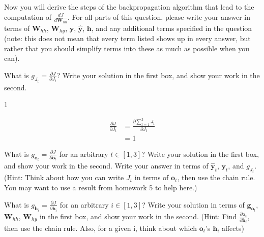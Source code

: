 \documentclass[11pt,addpoints,answers]{exam}
\newcommand{\gv}{\mathbf{g}}
\newcommand{\hv}{\mathbf{h}}
\newcommand{\ov}{\mathbf{o}}
\newcommand{\yv}{\mathbf{y}}
\newcommand{\Wv}{\mathbf{W}}
\begin{document}
\begin{questions}
\begin{parts}
\begin{subparts}
\subpart Now you will derive the steps of the backpropagation algorithm that lead to the computation of $\frac{dJ}{d\Wv_{hh}}$. For all parts of this question, please write your answer in terms of $\Wv_{hh}$, $\Wv_{hy}$, $\yv$, $\hat{\yv}$, $\hv$, and any additional terms specified in the question (note: this does not mean that every term listed shows up in every answer, but rather that you should simplify terms into these as much as possible when you can).
\clearpage
    \begin{subsubparts}
        \subsubpart[2] What is $g_{J_t} = \frac{\partial J}{\partial J_t}$? Write your solution in the first box, and show your work in the second.
        
    \begin{your_solution}[title=$\frac{\partial J}{\partial J_t}$,height=2.5cm,width=8.5cm]
    1
    \end{your_solution}
    
    \begin{your_solution}[title=Work,height=6cm,width=14cm]
	\[
	\begin{aligned}
		\frac{\partial J}{\partial J_t} &= \frac{\partial \sum_{t=1}^3 J_t}{\partial J_t} \\
										&= 1
	\end{aligned}
	\]    
    \end{your_solution}

     \subsubpart[2] What is $g_{\ov_t} = \frac{\partial J}{\partial \ov_t}$ for an arbitrary $t \in [1,3]$? Write your solution in the first box, and show your work in the second. Write your answer in terms of $\hat{\yv}_t$, $\yv_t$, and $g_{J_t}$. (Hint: Think about how you can write $J_t$ in terms of $\ov_t$, then use the chain rule. You may want to use a result from homework 5 to help here.)
        
    \begin{your_solution}[title=$\frac{\partial J}{\partial \ov_t}$,height=2.5cm,width=8.5cm]
    \end{your_solution}
    
    \begin{your_solution}[title=Work,height=6cm,width=14cm]
    \end{your_solution}

\clearpage
    \subsubpart[2] What is $g_{\hv_i} = \frac{\partial J}{\partial \hv_i}$ for an arbitrary $i \in [1,3]$? Write your solution in terms of $\gv_{\ov_t}$, $\Wv_{hh}$, $\Wv_{hy}$ in the first box, and show your work in the second. (Hint: Find $\frac{\partial \ov_t}{\partial \hv_i}$, then use the chain rule. Also, for a given i, think about which $\ov_t$'s  $\hv_i$ affects)
        

\end{subsubparts}
\end{subparts}
\end{parts}
\end{questions}
\end{document}
